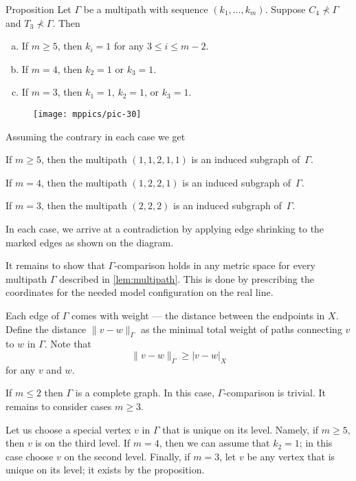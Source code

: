 \documentclass{article}
\begin{document}
\begin{thm}{Proposition}\label{lem:multipath}
Let $\Gamma$ be a multipath with sequence $(k_1,\dots, k_m)$.
Suppose $C_4\nprec\Gamma$ and  $T_3\nprec\Gamma$.
Then 
\begin{enumerate}[(a)]
 \item\label{lem:multipath:5} If $m\ge 5$, then $k_i=1$ for any $3\le i\le m-2$.
 \item\label{lem:multipath:4} If $m= 4$, then $k_2=1$ or $k_3=1$.
 \item\label{lem:multipath:3} If $m= 3$, then $k_1=1$, $k_2=1$, or $k_3=1$.
\end{enumerate}

\end{thm}

\begin{figure}[h!]
\centering
\texttt{[image: mppics/pic-30]}
\end{figure}

 Assuming the contrary in each case we get

If $m\ge 5$, then the multipath $(1,1,2,1,1)$ is an induced subgraph of~$\Gamma$.

If $m=4$, then the multipath $(1,2,2,1)$ is an induced subgraph of~$\Gamma$.

If $m=3$, then the multipath $(2,2,2)$ is an induced subgraph of~$\Gamma$.

In each case, we arrive at a contradiction by applying edge shrinking to the marked edges as shown on the diagram.
\qeds


It remains to show that $\Gamma$-comparison holds in any metric space for every multipath $\Gamma$ described in \ref{lem:multipath}.
This is done by prescribing the coordinates for the needed model configuration on the real line.

Each edge of $\Gamma$ comes with weight --- the distance between the endpoints in $X$.
Define the distance $\|v-w\|_\Gamma$ as the minimal total weight of paths connecting $v$ to $w$ in $\Gamma$.
Note that 
\[\|v-w\|_\Gamma\ge |v-w|_X\]
for any $v$ and $w$.

If $m\le 2$ then $\Gamma$ is a complete graph.
In this case, $\Gamma$-comparison is trivial.
It remains to consider cases $m\ge3$.

Let us choose a special vertex $v$ in $\Gamma$ that is unique on its level.
Namely, if $m\ge 5$, then $v$ is on the third level.
If $m=4$, then we can assume that $k_2=1$; in this case choose $v$ on the second level.
Finally, if $m=3$, let $v$ be any vertex that is unique on its level; it exists by the proposition. 
\end{document}
